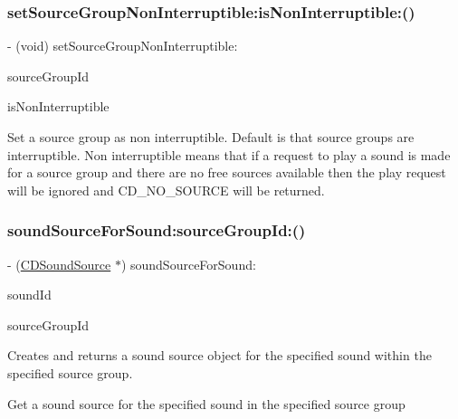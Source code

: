 \subsubsection{\texorpdfstring{set\+Source\+Group\+Non\+Interruptible\+:is\+Non\+Interruptible\+:()}{setSourceGroupNonInterruptible:isNonInterruptible:()}}
{\footnotesize\ttfamily -\/ (void) set\+Source\+Group\+Non\+Interruptible\+: \begin{DoxyParamCaption}\item[{(int)}]{source\+Group\+Id }\item[{isNonInterruptible:(B\+O\+OL)}]{is\+Non\+Interruptible }\end{DoxyParamCaption}}

Set a source group as non interruptible. Default is that source groups are interruptible. Non interruptible means that if a request to play a sound is made for a source group and there are no free sources available then the play request will be ignored and C\+D\+\_\+\+N\+O\+\_\+\+S\+O\+U\+R\+CE will be returned. \mbox{\label{interfaceCDSoundEngine_ab0c372cb85df05a4070b8f8bd2213efd}} 
\subsubsection{\texorpdfstring{sound\+Source\+For\+Sound\+:source\+Group\+Id\+:()}{soundSourceForSound:sourceGroupId:()}\hspace{0.1cm}{\footnotesize\ttfamily [1/4]}}
{\footnotesize\ttfamily -\/ (\hyperlink{interfaceCDSoundSource}{C\+D\+Sound\+Source} $\ast$) sound\+Source\+For\+Sound\+: \begin{DoxyParamCaption}\item[{(int)}]{sound\+Id }\item[{sourceGroupId:(int)}]{source\+Group\+Id }\end{DoxyParamCaption}}

Creates and returns a sound source object for the specified sound within the specified source group.

Get a sound source for the specified sound in the specified source group \mbox{\label{interfaceCDSoundEngine_ab0c372cb85df05a4070b8f8bd2213efd}} 
